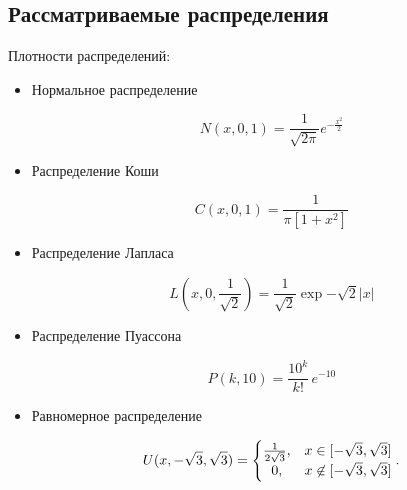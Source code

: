 \subsection{Рассматриваемые распределения}
Плотности распределений:
\begin{itemize}
	\item{Нормальное распределение}
	
	\begin{equation}
		N(x, 0, 1) = \frac{1}{ \sqrt {2\pi } }e^{-\frac{{x}^2 }{2}}
	\end{equation}
	
	\item{Распределение Коши}
	
	\begin{equation}
		C(x, 0, 1) =  \frac{1}{\pi \left[1 + {x}^2\right]}
	\end{equation}
	
	\item{Распределение Лапласа}
	
	\begin{equation}
		L(x, 0, \frac{1}{\sqrt{2}}) = \frac{1}{\sqrt{2}} \exp{-\sqrt{2}|x|}
	\end{equation}

	\item{Распределение Пуассона}
	
	\begin{equation} 
		P(k, 10) = \frac{10^k}{k!}\, e^{-10}
	\end{equation}
	
	\item{Равномерное распределение}
	
	\begin{equation} 
		U(x, -\sqrt{3}, \sqrt{3}) = \left\{
		\begin{matrix}
			{1 \over 2\sqrt{3}}, & x\in [-\sqrt{3},\sqrt{3}] \\
			0, & x\not\in [-\sqrt{3},\sqrt{3}]
		\end{matrix}
		\right..
	\end{equation}
	
\end{itemize}